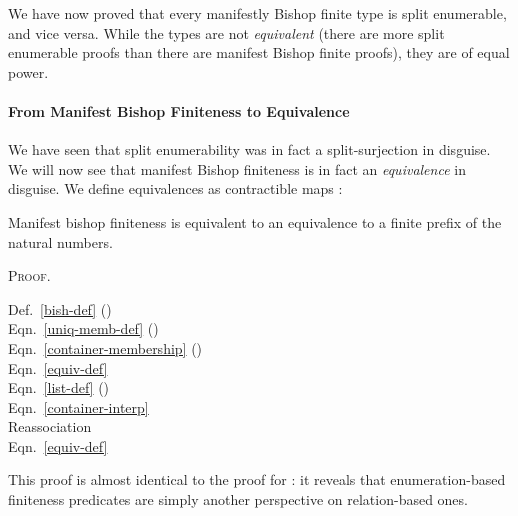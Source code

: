 We have now proved that every manifestly Bishop finite type is split enumerable,
and vice versa.
While the types are not \emph{equivalent} (there are more split enumerable
proofs than there are manifest Bishop finite proofs), they are of equal power.
\paragraph{From Manifest Bishop Finiteness to Equivalence}
We have seen that split enumerability was in fact a split-surjection in
disguise.
We will now see that manifest Bishop finiteness is in fact an \emph{equivalence}
in disguise.
We define equivalences as contractible maps \cite[definition 4.4.1]{hottbook}:
    \begin{paracol}{2}
      \switchcolumn%
    \end{paracol}
\begin{lemma}\label{bishop-equiv}
  Manifest bishop finiteness is equivalent to an equivalence to a finite prefix
  of the natural numbers.
\end{lemma}\noindent%
\textsc{Proof.}

\begin{minipage}[t]{.83\textwidth}\vspace{-1.25\baselineskip}
\end{minipage}
\begin{minipage}[t]{.16\textwidth}
  Def.~\ref{bish-def} ()     \\
  Eqn.~\ref{uniq-memb-def} (\AgdaDatatype{\ensuremath{\in!}})       \\
  Eqn.~\ref{container-membership} (\AgdaDatatype{\ensuremath{\in}}) \\
  Eqn.~\ref{equiv-def} \\
  Eqn.~\ref{list-def} ({}) \\
  Eqn.~\ref{container-interp}  \\
  Reassociation \\
  Eqn.~\ref{equiv-def}
\end{minipage}

This proof is almost identical to the proof for
: it reveals that
enumeration-based finiteness predicates are simply another perspective on
relation-based ones.

